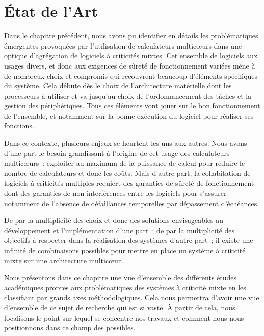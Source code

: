 \documentclass[french, a4paper, 11pt, twoside, pdftex]{StyleThese}
\begin{document}
\setcounter{chapter}{2} %
\dominitoc
\faketableofcontents
\fi

\chapter{État de l'Art} \label{chap:2_StateofArt}
\minitoc

Dans le \hyperref[chap:1_EnjeuxIntro]{chapitre précédent}, nous avons pu identifier en détails les problématiques émergentes provoquées par l'utilisation de calculateurs multicœurs dans une optique d'agrégation de logiciels à criticités mixtes. Cet ensemble de logiciels aux usages divers, et donc aux exigences de sûreté de fonctionnement variées mène à de nombreux choix et compromis qui recouvrent beaucoup d'éléments spécifiques du système. Cela débute dès le choix de l'architecture matérielle dont les processeurs à utiliser et va jusqu'au choix de l'ordonnancement des tâches et la gestion des périphériques. Tous ces éléments vont jouer sur le bon fonctionnement de l'ensemble, et notamment sur la bonne exécution du logiciel pour réaliser ses fonctions.

Dans ce contexte, plusieurs enjeux se heurtent les uns aux autres. Nous avons d'une part le besoin grandissant à l'origine de cet usage des calculateurs multicœurs~: exploiter au maximum de la puissance de calcul pour réduire le nombre de calculateurs et donc les coûts. Mais d'autre part, la cohabitation de logiciels à criticités multiples requiert des garanties de sûreté de fonctionnement dont des garanties de non-interférences entre les logiciels pour s'assurer notamment de l'absence de défaillances temporelles par dépassement d'échéances.

De par la multiplicité des choix et donc des solutions envisageables au développement et l'implémentation d'une part~; de par la multiplicité des objectifs à respecter dans la réalisation des systèmes d'autre part~; il existe une infinité de combinaisons possibles pour mettre en place un système à criticité mixte sur une architecture multicœur.

Nous présentons dans ce chapitre une vue d'ensemble des différents études académiques propres aux problématiques des systèmes à criticité mixte en les classifiant par grands axes méthodologiques. Cela nous permettra d'avoir une vue d'ensemble de ce sujet de recherche qui est si vaste. À partir de cela, nous focalisons le point sur lequel se concentre nos travaux et comment nous nous positionnons dans ce champ des possibles.
\end{document}
